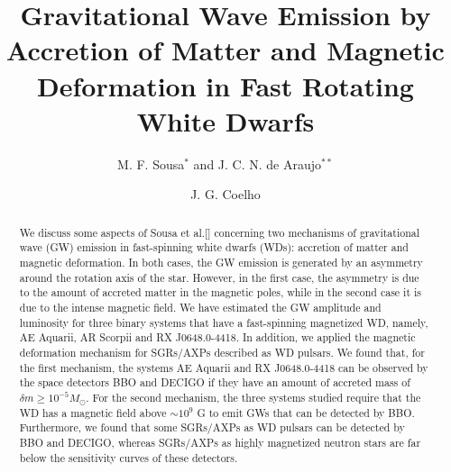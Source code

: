 \documentclass{ws-procs961x669}            %
\begin{document}
\title{Gravitational Wave Emission by Accretion of Matter and Magnetic Deformation in Fast Rotating White Dwarfs}

\author{M. F. Sousa$^*$ and J. C. N. de Araujo$^{**}$}

\address{Divis\~{a}o de Astrof\'{i}sica, Instituto Nacional de Pesquisas Espaciais,\\
S\~{a}o Jos\'{e} dos Campos, SP/12227-010, Brazil\\
$^*$E-mail: manoel.sousa@inpe.br\\
$^{**}$E-mail: jcarlos.dearaujo@inpe.br\\
www.inpe.br}

\author{J. G. Coelho}

\address{Departamento de F\'isica, Universidade Tecnol\'ogica Federal do Paran\'a,\\
Medianeira, PR/85884-000, Brazil\\
E-mail: jazielcoelho@utfpr.edu.br}

\begin{abstract}

We discuss some aspects of Sousa et al.[] concerning two mechanisms of gravitational wave (GW) emission in fast-spinning white dwarfs (WDs): accretion of matter and magnetic deformation. In both cases, the GW emission is generated by an asymmetry around the rotation axis of the star. However, in the first case, the asymmetry is due to the amount of accreted matter in the magnetic poles, while in the second case it is due to the intense magnetic field. We have estimated the GW amplitude and luminosity for three binary systems that have a fast-spinning magnetized WD, namely, AE Aquarii, AR Scorpii and RX J0648.0-4418. In addition, we applied the magnetic deformation mechanism for SGRs/AXPs described as WD pulsars. We found that, for the first mechanism, the systems AE Aquarii and RX J0648.0-4418 can be observed by the space detectors BBO and DECIGO if they have an amount of accreted mass of $\delta m \geq 10^{-5}M_{\odot }$. For the second mechanism, the three systems studied require that the WD has a magnetic field above $\sim 10^{9}$ G to emit GWs that can be detected by BBO. Furthermore, we found that some SGRs/AXPs as WD pulsars can be detected by BBO and DECIGO, whereas SGRs/AXPs as highly magnetized neutron stars are far below the sensitivity curves of these detectors.
\end{abstract}

\end{document}
